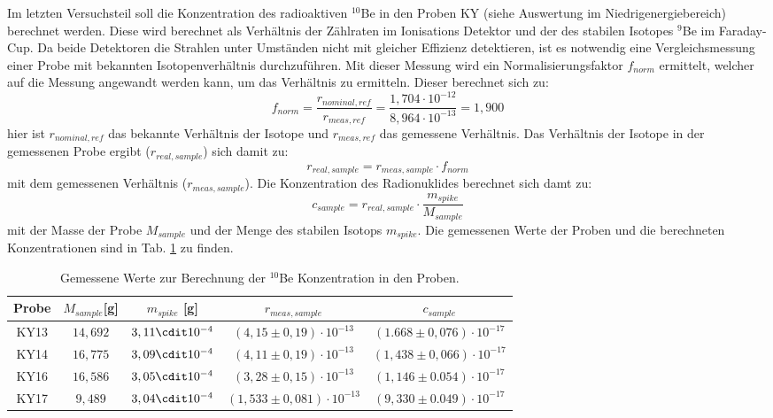 Im letzten Versuchsteil soll die Konzentration des radioaktiven $^{10}$Be in den Proben KY (siehe Auswertung im Niedrigenergiebereich) berechnet werden.
Diese wird berechnet als Verhältnis der Zählraten im Ionisations Detektor und der des stabilen Isotopes $^9$Be im Faraday-Cup.
Da beide Detektoren die Strahlen unter Umständen nicht mit gleicher Effizienz detektieren, ist es notwendig eine Vergleichsmessung einer Probe mit bekannten Isotopenverhältnis durchzuführen.
Mit dieser Messung wird ein Normalisierungsfaktor $f_{norm}$ ermittelt, welcher auf die Messung angewandt werden kann, um das Verhältnis zu ermitteln.
Dieser berechnet sich zu:
\[
f_{norm} = \frac{r_{nominal, ref}}{r_{meas, ref}} = \frac{1,704 \cdot 10^{-12}}{8,964 \cdot 10^{-13}} = 1,900
\]
hier ist $r_{nominal, ref}$ das bekannte Verhältnis der Isotope und $r_{meas, ref}$ das gemessene Verhältnis.
Das Verhältnis der Isotope in der gemessenen Probe ergibt ($r_{real, sample}$) sich damit zu:
\[
r_{real, sample} = r_{meas, sample} \cdot f_{norm}
\]
mit dem gemessenen Verhältnis ($ r_{meas, sample}$).
Die Konzentration des Radionuklides berechnet sich damt zu:
\begin{equation}
c_{sample} = r_{real, sample} \cdot \frac{m_{spike}}{M_{sample}}
\end{equation}
mit der Masse der Probe $M_{sample}$ und der Menge des stabilen Isotops $m_{spike}$.
Die gemessenen Werte der Proben und die berechneten Konzentrationen sind in Tab. \ref{concentrations} zu finden.

\begin{table}[h]
\centering
\caption{Gemessene Werte zur Berechnung der $^{10}$Be Konzentration in den Proben.}
\begin{tabular}{|c |c| c|c|c|}
\hline
Probe& $M_{sample}$[g] & $m_{spike}$ [g] & $ r_{meas, sample}$ & $c_{sample}$ \\
\hline
KY13 & $14,692$ &  $3,11 \cdit 10^{-4}$ & $ (4,15 \pm 0,19)\cdot 10^{-13}$ &     $(1.668 \pm 0,076) \cdot 10^{-17}$ \\
KY14 & $16,775$ &  $3,09 \cdit 10^{-4}$ & $ (4,11 \pm 0,19)\cdot 10^{-13}$ &     $(1,438 \pm 0,066) \cdot 10^{-17}$ \\
KY16 & $16,586$ &  $3,05 \cdit 10^{-4}$ & $ (3,28 \pm 0,15)\cdot 10^{-13}$ &     $(1,146 \pm 0.054) \cdot 10^{-17}$ \\
KY17 & $9,489  $ &  $3,04 \cdit 10^{-4}$ & $ (1,533 \pm 0,081)\cdot 10^{-13}$ & $(9,330 \pm 0.049) \cdot 10^{-17}$ \\
\hline
\end{tabular}
\label{concentrations}
\end{table}

